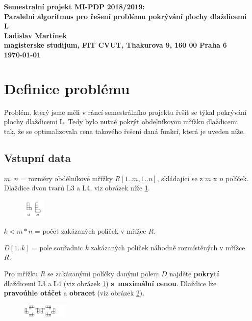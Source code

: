 \documentclass[]{article}
\begin{document}
\begin{center}
\bf Semestralní projekt MI-PDP 2018/2019:\\[5mm]
    Paralelni algoritmus pro řešení problému pokrývání plochy dlaždicemi L\\[5mm] 
       Ladislav Martínek\\[2mm]
magisterske studijum, FIT CVUT, Thakurova 9, 160 00 Praha 6\\[2mm]
\today
\end{center}

\section{Definice problému}

Problém, který jsme měli v ráncí semestrálního projektu řešit se týkal pokrývání plochy dlaždicemi L. Tedy bylo nutné pokrýt obdelníkovou mřížku dlaždicemi tak, že se optimalizovala cena takového řešení daná funkcí, která je uveden níže. 


\subsection{Vstupní data}
$m$, $n$ = rozměry obdélníkové mřížky $R[1..m,1..n]$, skládající se z $m$ x $n$ políček.
Dlaždice dvou tvarů L3 a L4, viz obrázek níže \ref{obr1}.

  \begin{figure}[H]\centering
	\includegraphics[width=0.1\textwidth]{img/ll.png}
 	\label{obr1}
 \end{figure}


\noindent
$k <m*n $ = počet zakázaných políček v mřížce $R$.

\noindent
$D[1..k]$ = pole souřadnic $k$ zakázaných políček náhodně rozmístěných v mřížce $R$.

\noindent
Pro mřížku $R$ se zakázanými políčky danými polem $D$ najděte \textbf{pokrytí}  dlaždicemi L3 a L4 (viz obrázek \ref{obr1}) \textbf{s~maximální cenou}.
Dlaždice lze \textbf{pravoúhle otáčet} a \textbf{obracet} (viz obrázek \ref{obr2}).

    \begin{figure}[H]\centering
	\includegraphics[width=0.2\textwidth]{img/l2.png}
 	\label{obr2}
 \end{figure}
  
\end{document}
